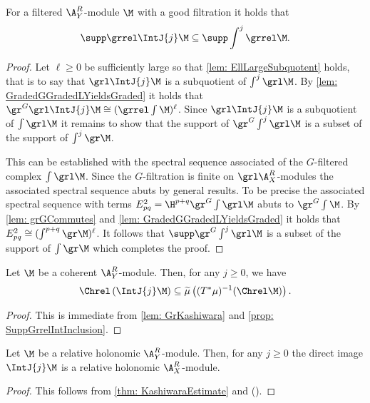 \begin{proposition}\label{prop: SuppGrrelIntInclusion}
For a filtered $\A_Y^R$-module $\M$ with a good filtration it holds that  $$\supp \grrel\IntJ{j}\M \subseteq \supp \int^j \grrel\M.$$
\end{proposition}
\begin{proof}
Let $\ell\geq 0$ be sufficiently large so that \cref{lem: EllLargeSubquotent} holds, that is to say that $\grl\IntJ{j} \M$ is a subquotient of $\int^j \grl \M$.
By \cref{lem: GradedGGradedLYieldsGraded} it holds that $\gr^G\grl \IntJ{j} \M \cong (\grrel\int\M)^\ell$.
Since $\grl \IntJ{j} \M$ is a subquotient of $\int \grl\M$ it remains to show that the support of $\gr^G \int^j \grl\M$ is a subset of the support of $\int^j \gr \M$.

This can be established with the spectral sequence associated of the $G$-filtered complex $\int \grl \M$. Since the $G$-filtration is finite on $\grl\A_X^R$-modules the associated spectral sequence abuts by general results. To be precise the associated spectral sequence with terms
$E^2_{pq} = \H^{p+q}\gr^G \int \grl \M$ abuts to $\gr^G\int \M$.
By \cref{lem: grGCommutes} and \cref{lem: GradedGGradedLYieldsGraded} it holds that $E^2_{pq} \cong (\int^{p+q}\gr \M)^\ell$. 
It follows that $\supp\gr^G \int^j \grl\M$ is a subset of the support of $\int \gr \M$ which completes the proof.
\end{proof}
\begin{theorem}\label{thm: KashiwaraEstimate}
Let $\M$ be a coherent $\A_Y^R$-module. Then, for any $j\geq 0$, we have
$$\Chrel\left(\IntJ{j} \M \right)\subseteq  \widetilde{\mu}\left((T^*\mu)^{-1}(\Chrel \M) \right).$$
\end{theorem}
\begin{proof}
This is immediate from \cref{lem: GrKashiwara} and \cref{prop: SuppGrrelIntInclusion}.
\end{proof}
\begin{corollary}\label{cor: RelHolConserved}
Let $\M$ be a relative holonomic $\A_Y^R$-module. Then, for any $j\geq 0$ the direct image $\IntJ{j}\M$ is a relative holonomic $\A_X^R$-module.
\end{corollary}
\begin{proof}
This follows from \cref{thm: KashiwaraEstimate} and ().
\end{proof}






